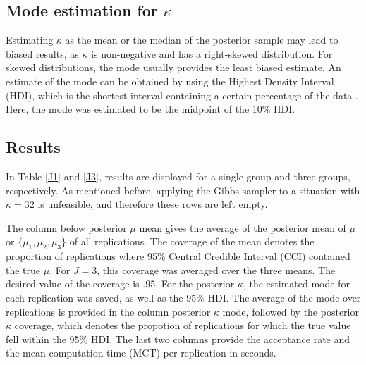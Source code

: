 \documentclass[]{gSCS2e}
\theoremstyle{plain}
\theoremstyle{definition}
\theoremstyle{remark}
\begin{document}
\renewcommand{\footnoterule}{%
  \kern -3pt
  \hrule width \textwidth height 0pt
  \kern 2pt
}

%




\subsection{Mode estimation for $\kappa$ \label{hdimode}}

Estimating $\kappa$ as the mean or the median of the posterior sample may lead to biased results, as $\kappa$ is non-negative and has a right-skewed distribution. For skewed distributions, the mode usually provides the least biased estimate. An estimate of the mode can be obtained by using the Highest Density Interval (HDI), which is the shortest interval containing a certain percentage of the data \citep{venter1967estimation}. Here, the mode was estimated to be the midpoint of the 10\% HDI. 

\subsection{Results}

In Table \ref{J1} and \ref{J3}, results are displayed for a single group and three groups, respectively. As mentioned before, applying the Gibbs sampler to a situation with $\kappa=32$ is unfeasible, and therefore these rows are left empty. 

The column below posterior $\mu$ mean gives the average of the posterior mean of $\mu$ or $\{\mu_1, \mu_2, \mu_3 \}$ of all replications. The coverage of the mean denotes the proportion of replications where 95\% Central Credible Interval (CCI) contained the true $\mu$. For $J=3$, this coverage was averaged over the three means. The desired value of the coverage is .95. For the posterior $\kappa$, the estimated mode for each replication was saved, as well as the 95\% HDI. The average of the mode over replications is provided in the column posterior $\kappa$ mode, followed by the posterior $\kappa$ coverage, which denotes the propotion of replications for which the true value fell within the 95\% HDI. The last two columns provide the acceptance rate and the mean computation time (MCT) per replication in seconds. 
\end{document}
